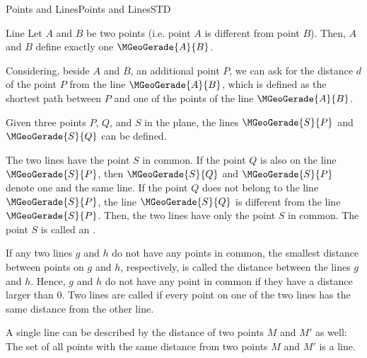 \begin{MXContent}{Points and Lines}{Points and Lines}{STD}
\begin{MXInfo}{Line}
Let $A$ and $B$ be two points (i.e. point $A$ is different from point $B$). Then, $A$ and $B$ define
exactly one  $\MGeoGerade{A}{B}$.
\end{MXInfo}

Considering, beside $A$ and $B$, an additional point $P$, we can ask for the distance $d$ of the point 
$P$ from the line $\MGeoGerade{A}{B}$, which is defined as the shortest path between $P$ and one of 
the points of the line $\MGeoGerade{A}{B}$.

\begin{center}
\end{center}

Given three points $P$, $Q$, and $S$ in the plane, the lines $\MGeoGerade{S}{P}$ and 
$\MGeoGerade{S}{Q}$ can be defined.

The two lines have the point $S$ in common. If the point $Q$ is also on the line $\MGeoGerade{S}{P}$,
then $\MGeoGerade{S}{Q}$ and $\MGeoGerade{S}{P}$ denote one and the same line. If the 
point $Q$ does not belong to the line $\MGeoGerade{S}{P}$, the line $\MGeoGerade{S}{Q}$ is
different from the line $\MGeoGerade{S}{P}$. Then, the two lines have only the point $S$ in common.
The point $S$ is called an . 

If any two lines $g$ and $h$ do not have any points in common, the smallest 
distance between points on $g$ and $h$, respectively, is called the distance between 
the lines $g$ and $h$. Hence, $g$ and $h$ do not have any point in common if they have 
a distance larger than $0$. Two lines are called  if every point 
on one of the two lines has the same distance from the other line.

A single line can be described by the distance of two points $M$ and $M'$ as well: The set 
of all points with the same distance from two points $M$ and $M'$ is a line.


\end{MXContent}
